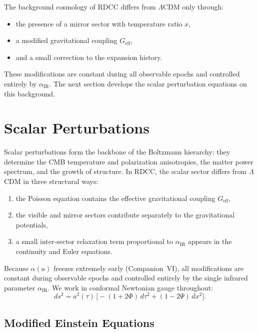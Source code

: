 \documentclass[11pt,a4paper]{article}
\begin{document}
The background cosmology of RDCC differs from $\Lambda$CDM only through:
\begin{itemize}
    \item the presence of a mirror sector with temperature ratio $x$,
    \item a modified gravitational coupling $G_{\mathrm{eff}}$,
    \item and a small correction to the expansion history.
\end{itemize}

These modifications are constant during all observable epochs and controlled entirely by
$\alpha_{\mathrm{IR}}$. The next section develops the scalar perturbation equations on this
background.

\section{Scalar Perturbations}

Scalar perturbations form the backbone of the Boltzmann hierarchy: they determine the CMB
temperature and polarization anisotropies, the matter power spectrum, and the growth of
structure. In RDCC, the scalar sector differs from $\Lambda$CDM in three structural ways:

\begin{enumerate}
    \item the Poisson equation contains the effective gravitational coupling $G_{\mathrm{eff}}$,
    \item the visible and mirror sectors contribute separately to the gravitational potentials,
    \item a small inter-sector relaxation term proportional to $\alpha_{\mathrm{IR}}$ appears in the
    continuity and Euler equations.
\end{enumerate}

Because $\alpha(a)$ freezes extremely early (Companion~VI), all modifications are constant
during observable epochs and controlled entirely by the single infrared parameter
$\alpha_{\mathrm{IR}}$. We work in conformal Newtonian gauge throughout:
\begin{equation}
    ds^{2} = a^{2}(\tau)\,\bigl[-(1+2\Phi)\,d\tau^{2} + (1-2\Psi)\,dx^{2}\bigr].
\end{equation}

\subsection{Modified Einstein Equations}
\end{document}
